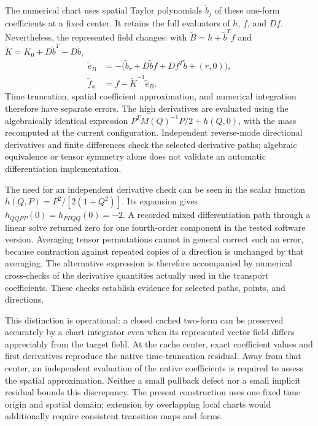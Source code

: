 The numerical chart uses spatial Taylor polynomials $\widetilde b_j$ of these one-form coefficients at a fixed center. It retains the full evaluators of $h$, $f$, and $Df$. Nevertheless, the represented field changes: with $\widetilde B=h+\widetilde b^Tf$ and $\widetilde K=K_0+D\widetilde b^T-D\widetilde b$,
\begin{equation}
 \begin{aligned}
 \widetilde e_B&=-\bigl(\widetilde b_\tau+D\widetilde b f
                         +Df^T\widetilde b+(r,0)\bigr),\\
 \widetilde f_a&=f-\widetilde K^{-1}\widetilde e_B .
\end{aligned}
 \label{eq:th-cache-residual}
\end{equation}
Time truncation, spatial coefficient approximation, and numerical integration therefore have separate errors. The high derivatives are evaluated using the algebraically identical expression $P^TM(Q)^{-1}P/2+h(Q,0)$, with the mass recomputed at the current configuration. Independent reverse-mode directional derivatives and finite differences check the selected derivative paths; algebraic equivalence or tensor symmetry alone does not validate an automatic differentiation implementation.

The need for an independent derivative check can be seen in the scalar function $h(Q,P)=P^2/[2(1+Q^2)]$. Its expansion gives $h_{QQPP}(0)=h_{PPQQ}(0)=-2$. A recorded mixed differentiation path through a linear solve returned zero for one fourth-order component in the tested software version. Averaging tensor permutations cannot in general correct such an error, because contraction against repeated copies of a direction is unchanged by that averaging. The alternative expression is therefore accompanied by numerical cross-checks of the derivative quantities actually used in the transport coefficients. These checks establish evidence for selected paths, points, and directions.

This distinction is operational: a closed cached two-form can be preserved accurately by a chart integrator even when its represented vector field differs appreciably from the target field. At the cache center, exact coefficient values and first derivatives reproduce the native time-truncation residual. Away from that center, an independent evaluation of the native coefficients is required to assess the spatial approximation. Neither a small pullback defect nor a small implicit residual bounds this discrepancy. The present construction uses one fixed time origin and spatial domain; extension by overlapping local charts would additionally require consistent transition maps and forms.


